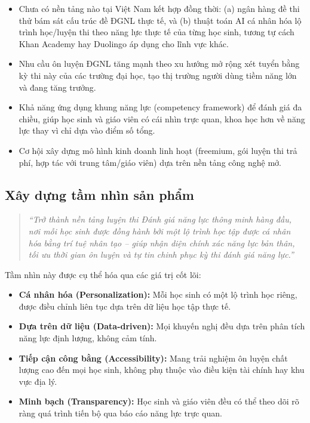 \documentclass[12pt,a4paper]{article}
\begin{document}
	\begin{itemize}
		\item Chưa có nền tảng nào tại Việt Nam kết hợp đồng thời: (a) ngân hàng đề thi thử bám sát cấu trúc đề ĐGNL thực tế, và (b) thuật toán AI cá nhân hóa lộ trình học/luyện thi theo năng lực thực tế của từng học sinh, tương tự cách Khan Academy hay Duolingo áp dụng cho lĩnh vực khác.
		\item Nhu cầu ôn luyện ĐGNL tăng mạnh theo xu hướng mở rộng xét tuyển bằng kỳ thi này của các trường đại học, tạo thị trường người dùng tiềm năng lớn và đang tăng trưởng.
		\item Khả năng ứng dụng khung năng lực (competency framework) để đánh giá đa chiều, giúp học sinh và giáo viên có cái nhìn trực quan, khoa học hơn về năng lực thay vì chỉ dựa vào điểm số tổng.
		\item Cơ hội xây dựng mô hình kinh doanh linh hoạt (freemium, gói luyện thi trả phí, hợp tác với trung tâm/giáo viên) dựa trên nền tảng công nghệ mở.
	\end{itemize}
	
	\subsection{Xây dựng tầm nhìn sản phẩm}
	
	\begin{quote}\itshape
		``Trở thành nền tảng luyện thi Đánh giá năng lực thông minh hàng đầu, nơi mỗi học sinh được đồng hành bởi một lộ trình học tập được cá nhân hóa bằng trí tuệ nhân tạo -- giúp nhận diện chính xác năng lực bản thân, tối ưu thời gian ôn luyện và tự tin chinh phục kỳ thi đánh giá năng lực.''
	\end{quote}
	
	Tầm nhìn này được cụ thể hóa qua các giá trị cốt lõi:
	\begin{itemize}[nosep]
		\item \textbf{Cá nhân hóa (Personalization):} Mỗi học sinh có một lộ trình học riêng, được điều chỉnh liên tục dựa trên dữ liệu học tập thực tế.
		\item \textbf{Dựa trên dữ liệu (Data-driven):} Mọi khuyến nghị đều dựa trên phân tích năng lực định lượng, không cảm tính.
		\item \textbf{Tiếp cận công bằng (Accessibility):} Mang trải nghiệm ôn luyện chất lượng cao đến mọi học sinh, không phụ thuộc vào điều kiện tài chính hay khu vực địa lý.
		\item \textbf{Minh bạch (Transparency):} Học sinh và giáo viên đều có thể theo dõi rõ ràng quá trình tiến bộ qua báo cáo năng lực trực quan.
	\end{itemize}
	
\end{document}
